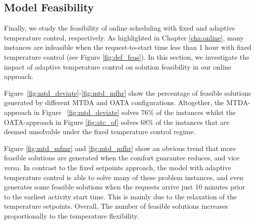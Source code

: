 \subsection{Model Feasibility} \label{sec:feasibility}

Finally, we study the feasibility of online scheduling with fixed and adaptive temperature control, respectively. As highlighted in Chapter \ref{cha:online}, many instances are infeasible when the request-to-start time less than 1 hour with fixed temperature control (see Figure \ref{fig:def_feas}). In this section, we investigate the impact of adaptive temperature control on solution feasibility in our online approach.

Figure~\ref{fig:mtd_deviate}-\ref{fig:mtd_mfhr} show the percentage of feasible solutions generated by different MTDA and OATA configurations. 
Altogether, the MTDA-approach in Figure ~\ref{fig:mtd_deviate} solves 76\% of the instances whilst the OATA-approach in Figure \ref{fig:atc_of} solves 68\% of the instances that are deemed unsolvable under the fixed temperature control regime. 

Figure \ref{fig:mtd_mfmr} and \ref{fig:mtd_mfhr} show an obvious trend that more feasible solutions are generated when the comfort guarantee reduces, and vice versa. In contrast to the fixed setpoints approach, the model with adaptive temperature control is able to solve many of these problem instances, and even generates some feasible solutions when the requests arrive just 10 minutes prior to the earliest activity start time. This is mainly due to the relaxation of the temperature setpoints. Overall, The number of feasible solutions increases proportionally to the temperature flexibility. 


